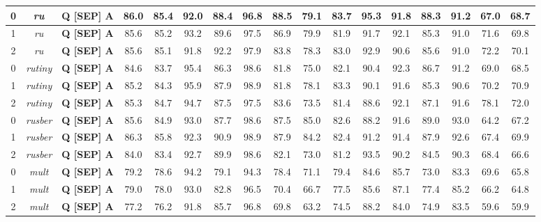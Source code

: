 \begin{table}[t]
{\begin{tabular}{|c|c||c|c|c|c|c|c|c|c|c|c|c|c|c|c|c|}
0 & \textit{ru} &  \textbf{Q [SEP] A} & 86.0 & 85.4 & 92.0 & 88.4 & 96.8 & 88.5 & 79.1 & 83.7 & 95.3 & 91.8 & 88.3 & 91.2 & 67.0 & 68.7\\ \hline
1 & \textit{ru} &  \textbf{Q [SEP] A} & 85.6 & 85.2 & 93.2 & 89.6 & 97.5 & 86.9 & 79.9 & 81.9 & 91.7 & 92.1 & 85.3 & 91.0 & 71.6 & 69.8\\ \hline
2 & \textit{ru} &  \textbf{Q [SEP] A} & 85.6 & 85.1 & 91.8 & 92.2 & 97.9 & 83.8 & 78.3 & 83.0 & 92.9 & 90.6 & 85.6 & 91.0 & 72.2 & 70.1\\ \hline
0 & \textit{rutiny} &  \textbf{Q [SEP] A} & 84.6 & 83.7 & 95.4 & 86.3 & 98.6 & 81.8 & 75.0 & 82.1 & 90.4 & 92.3 & 86.7 & 91.2 & 69.0 & 68.5\\ \hline
1 & \textit{rutiny} &  \textbf{Q [SEP] A} & 85.2 & 84.3 & 95.9 & 87.9 & 98.9 & 81.8 & 78.1 & 83.3 & 90.1 & 91.6 & 85.3 & 90.6 & 70.2 & 70.9\\ \hline
2 & \textit{rutiny} &  \textbf{Q [SEP] A} & 85.3 & 84.7 & 94.7 & 87.5 & 97.5 & 83.6 & 73.5 & 81.4 & 88.6 & 92.1 & 87.1 & 91.6 & 78.1 & 72.0\\ \hline
0 & \textit{rusber} &  \textbf{Q [SEP] A} & 85.6 & 84.9 & 93.0 & 87.7 & 98.6 & 87.5 & 85.0 & 82.6 & 88.2 & 91.6 & 89.0 & 93.0 & 64.2 & 67.2\\ \hline
1 & \textit{rusber} &  \textbf{Q [SEP] A} & 86.3 & 85.8 & 92.3 & 90.9 & 98.9 & 87.9 & 84.2 & 82.4 & 91.2 & 91.4 & 87.9 & 92.6 & 67.4 & 69.9\\ \hline
2 & \textit{rusber} &  \textbf{Q [SEP] A} & 84.0 & 83.4 & 92.7 & 89.9 & 98.6 & 82.1 & 73.0 & 81.2 & 93.5 & 90.2 & 84.5 & 90.3 & 68.4 & 66.6\\ \hline
0 & \textit{mult} &  \textbf{Q [SEP] A} & 79.2 & 78.6 & 94.2 & 79.1 & 94.3 & 78.4 & 71.1 & 79.4 & 84.6 & 85.7 & 73.0 & 83.3 & 69.6 & 65.8\\ \hline
1 & \textit{mult} &  \textbf{Q [SEP] A} & 79.0 & 78.0 & 93.0 & 82.8 & 96.5 & 70.4 & 66.7 & 77.5 & 85.6 & 87.1 & 77.4 & 85.2 & 66.2 & 64.8\\ \hline
2 & \textit{mult} &  \textbf{Q [SEP] A} & 77.2 & 76.2 & 91.8 & 85.7 & 96.8 & 69.8 & 63.2 & 74.5 & 88.2 & 84.0 & 74.9 & 83.5 & 59.6 & 59.9\\ \hline
\end{tabular}
}
\end{table}


